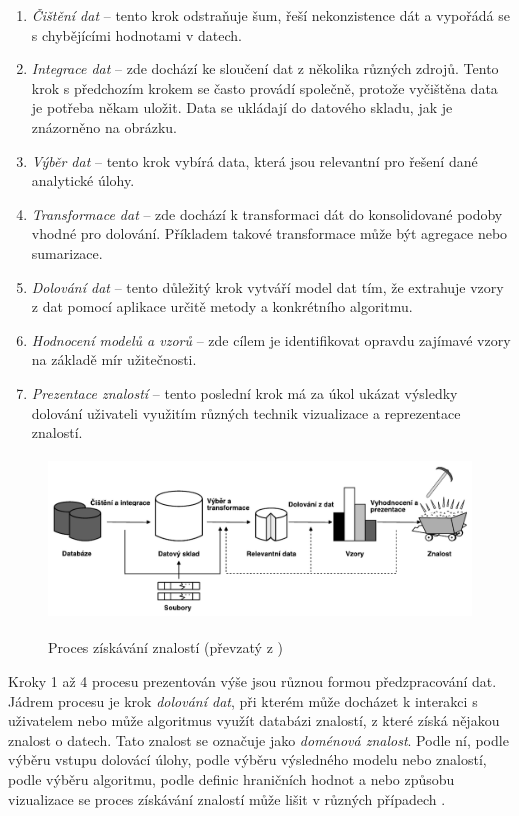 \begin{enumerate}
    \item \textit{Čištění dat} -- tento krok odstraňuje šum, řeší nekonzistence dát a vypořádá se s chybějícími hodnotami v datech.
    \item \textit{Integrace dat} -- zde dochází ke sloučení dat z několika různých zdrojů. Tento krok s předchozím krokem se často provádí společně, protože vyčištěna data je potřeba někam uložit. Data se ukládají do datového skladu, jak je znázorněno na obrázku.
    \item \textit{Výběr dat} -- tento krok vybírá data, která jsou relevantní pro řešení dané analytické úlohy.
    \item \textit{Transformace dat} -- zde dochází k transformaci dát do konsolidované podoby vhodné pro dolování. Příkladem takové transformace může být agregace nebo sumarizace.
    \item \textit{Dolování dat} -- tento důležitý krok vytváří model dat tím, že extrahuje vzory z dat pomocí aplikace určitě metody a konkrétního algoritmu. 
    \item \textit{Hodnocení modelů a vzorů} -- zde cílem je identifikovat opravdu zajímavé vzory na základě mír užitečnosti.
    \item \textit{Prezentace znalostí} -- tento poslední krok má za úkol ukázat výsledky dolování uživateli využitím různých technik vizualizace a reprezentace znalostí.
\end{enumerate}

\begin{figure}[h]\centering
  \centering
  \includegraphics[width=\linewidth,height=1.7in]{obrazky/proces_dolovani.pdf}\\[1pt]
  \caption{Proces získávání znalostí (převzatý z \cite{Han})}
  \label{proces}
\end{figure}

Kroky 1 až 4 procesu prezentován výše jsou různou formou předzpracování dat. Jádrem procesu je krok \textit{dolování dat}, při kterém může docházet k interakci s uživatelem nebo může algoritmus využít databázi znalostí, z které získá nějakou znalost o datech. Tato znalost se označuje jako \textit{doménová znalost}. Podle ní, podle výběru vstupu dolovácí úlohy, podle výběru výsledného modelu nebo znalostí, podle výběru algoritmu, podle definic hraničních hodnot a nebo způsobu vizualizace se proces získávání znalostí může lišit v různých případech \cite{Han}.

